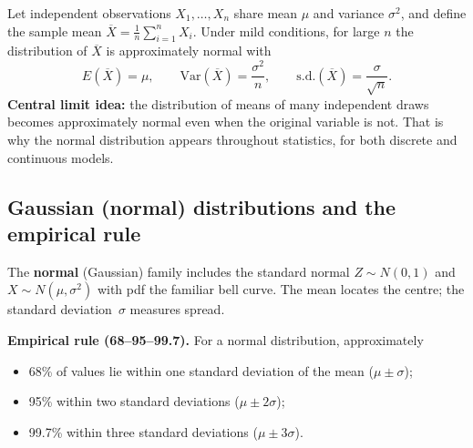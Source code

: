 Let independent observations $X_1,\ldots,X_n$ share mean $\mu$ and variance $\sigma^2$, and define the sample mean $\overline{X}=\frac1n\sum_{i=1}^n X_i$. Under mild conditions, for large $n$ the distribution of $\overline{X}$ is approximately normal with
\[
E(\overline{X})=\mu,\qquad \mathrm{Var}(\overline{X})=\frac{\sigma^2}{n},\qquad \mathrm{s.d.}(\overline{X})=\frac{\sigma}{\sqrt{n}}.
\]
\textbf{Central limit idea:} the distribution of means of many independent draws becomes approximately normal even when the original variable is not. That is why the normal distribution appears throughout statistics, for both discrete and continuous models.

\subsection{Gaussian (normal) distributions and the empirical rule}

The \textbf{normal} (Gaussian) family includes the standard normal $Z\sim N(0,1)$ and $X\sim N(\mu,\sigma^2)$ with pdf the familiar bell curve. The mean locates the centre; the standard deviation~$\sigma$ measures spread.

\textbf{Empirical rule (68--95--99.7).} For a normal distribution, approximately
\begin{itemize}[leftmargin=*]
  \item 68\% of values lie within one standard deviation of the mean ($\mu\pm\sigma$);
  \item 95\% within two standard deviations ($\mu\pm 2\sigma$);
  \item 99.7\% within three standard deviations ($\mu\pm 3\sigma$).
\end{itemize}

